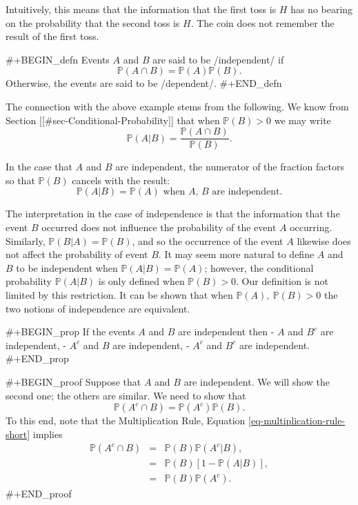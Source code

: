 Intuitively, this means that the information that the first toss is
\(H\) has no bearing on the probability that the second toss is
\(H\). The coin does not remember the result of the first toss.

#+BEGIN_defn
Events \(A\) and \(B\) are said to be /independent/ if 
\begin{equation}
\mathbb{P}(A\cap B)=\mathbb{P}(A)\mathbb{P}(B).
\end{equation}
Otherwise, the events are said to be /dependent/. 
#+END_defn

The connection with the above example stems from the following. We
know from Section [[#sec-Conditional-Probability]] that when
\(\mathbb{P}(B)>0\) we may write
\begin{equation}
\mathbb{P}(A|B)=\frac{\mathbb{P}(A\cap B)}{\mathbb{P}(B)}.
\end{equation}

In the case that \(A\) and \(B\) are independent, the numerator of the
fraction factors so that \(\mathbb{P}(B)\) cancels with the result:
\begin{equation}
\mathbb{P}(A|B)=\mathbb{P}(A)\mbox{ when \(A\), \(B\) are independent.}
\end{equation}

The interpretation in the case of independence is that the information
that the event \(B\) occurred does not influence the probability of
the event \(A\) occurring. Similarly,
\(\mathbb{P}(B|A)=\mathbb{P}(B)\), and so the occurrence of the event
\(A\) likewise does not affect the probability of event \(B\). It may
seem more natural to define \(A\) and \(B\) to be independent when
\(\mathbb{P}(A|B)=\mathbb{P}(A)\); however, the conditional
probability \(\mathbb{P}(A|B)\) is only defined when
\(\mathbb{P}(B)>0\). Our definition is not limited by this
restriction. It can be shown that when \(\mathbb{P}(A),\
\mathbb{P}(B)>0\) the two notions of independence are equivalent.

#+BEGIN_prop
If the events \(A\) and \(B\) are independent then
- \(A\) and \(B^{c}\) are independent,
- \(A^{c}\) and \(B\) are independent,
- \(A^{c}\) and \(B^{c}\) are independent.
#+END_prop

#+BEGIN_proof
Suppose that \(A\) and \(B\) are independent. We will show the second
one; the others are similar. We need to show that \[
\mathbb{P}(A^{c}\cap B)=\mathbb{P}(A^{c})\mathbb{P}(B).  \] To this
end, note that the Multiplication Rule, Equation
\eqref{eq-multiplication-rule-short} implies
\begin{eqnarray*}
\mathbb{P}(A^{c}\cap B) & = & \mathbb{P}(B)\mathbb{P}(A^{c}|B),\\
 & = & \mathbb{P}(B)[1-\mathbb{P}(A|B)],\\
 & = & \mathbb{P}(B)\mathbb{P}(A^{c}).
\end{eqnarray*}
#+END_proof

